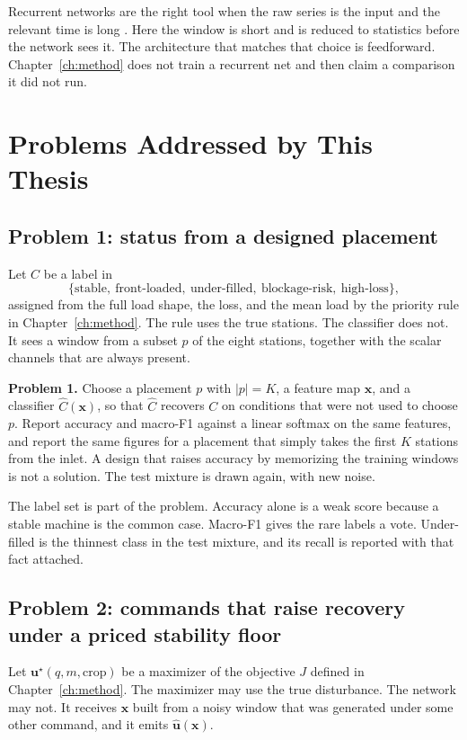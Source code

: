 Recurrent networks are the right tool when the raw series is the input and the relevant time is long \cite{lecun2015}. Here the window is short and is reduced to statistics before the network sees it. The architecture that matches that choice is feedforward. Chapter~\ref{ch:method} does not train a recurrent net and then claim a comparison it did not run.

\section{Problems Addressed by This Thesis}
\label{sec:problems}

\subsection{Problem 1: status from a designed placement}

Let \(C\) be a label in
\[
\{\text{stable},\ \text{front-loaded},\ \text{under-filled},\ \text{blockage-risk},\ \text{high-loss}\},
\]
assigned from the full load shape, the loss, and the mean load by the priority rule in Chapter~\ref{ch:method}. The rule uses the true stations. The classifier does not. It sees a window from a subset \(p\) of the eight stations, together with the scalar channels that are always present.

\textbf{Problem 1.} Choose a placement \(p\) with \(|p|=K\), a feature map \(\mathbf{x}\), and a classifier \(\hat C(\mathbf{x})\), so that \(\hat C\) recovers \(C\) on conditions that were not used to choose \(p\). Report accuracy and macro-F1 against a linear softmax on the same features, and report the same figures for a placement that simply takes the first \(K\) stations from the inlet. A design that raises accuracy by memorizing the training windows is not a solution. The test mixture is drawn again, with new noise.

The label set is part of the problem. Accuracy alone is a weak score because a stable machine is the common case. Macro-F1 gives the rare labels a vote. Under-filled is the thinnest class in the test mixture, and its recall is reported with that fact attached.

\subsection{Problem 2: commands that raise recovery under a priced stability floor}

Let \(\mathbf{u}^\star(q,m,\text{crop})\) be a maximizer of the objective \(J\) defined in Chapter~\ref{ch:method}. The maximizer may use the true disturbance. The network may not. It receives \(\mathbf{x}\) built from a noisy window that was generated under some other command, and it emits \(\hat{\mathbf{u}}(\mathbf{x})\).

